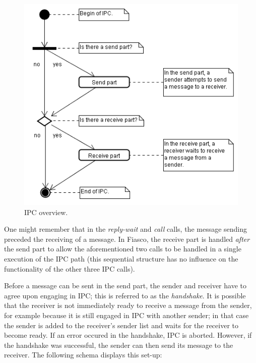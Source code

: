 \begin{figure}[ht]
\includegraphics[scale=0.50]{images/diagrams/ipc_activity_ipc_overview}
\caption{IPC overview.}
\end{figure}

One might remember that in the \emph{reply-wait} and \emph{call} calls, the message sending preceded the receiving of a message. In Fiasco, the receive part is handled \textit{after} the send part to allow the aforementioned two calls to be handled in a single execution of the IPC path (this sequential structure has no influence on the functionality of the other three IPC calls).\emptyline

Before a message can be sent in the send part, the sender and receiver have to agree upon engaging in IPC; this is referred to as the \emph{handshake}. It is possible that the receiver is not immediately ready to receive a message from the sender, for example because it is still engaged in IPC with another sender; in that case the sender is added to the receiver's sender list and waits for the receiver to become ready. If an error occured in the handshake, IPC is aborted. However, if the handshake was successful, the sender can then send its message to the receiver. The following schema displays this set-up:

